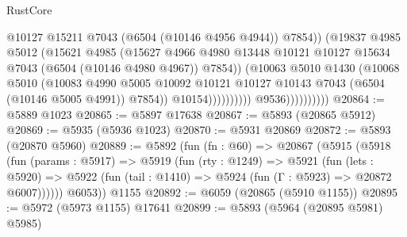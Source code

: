 \begin{lexlean}{RustCore}
\begin{coremodule}
                                            @10127
                                            @15211
                                            @7043
                                            (@6504 (@10146 @4956 @4944))
                                            @7854))
                                        (@19837
                                          @4985
                                          @5012
                                          (@15621
                                            @4985
                                            (@15627
                                              @4966
                                              @4980
                                              @13448
                                              @10121
                                              @10127
                                              @15634
                                              @7043
                                              (@6504 (@10146 @4980 @4967))
                                              @7854))
                                          (@10063
                                            @5010
                                            @1430
                                            (@10068
                                              @5010
                                              (@10083
                                                @4990
                                                @5005
                                                @10092
                                                @10121
                                                @10127
                                                @10143
                                                @7043
                                                (@6504 (@10146 @5005 @4991))
                                                @7854))
                                            @10154))))))))))
                        @9536))))))))))
@20864 := @5889 @1023
@20865 := @5897 @17638
@20867 := @5893 (@20865 @5912)
@20869 := @5935 (@5936 @1023)
@20870 := @5931 @20869
@20872 := @5893 (@20870 @5960)
@20889 := @5892
    (fun (fn : @60) =>
    @20867
      (@5915
        (@5918
          (fun (params : @5917) =>
          @5919
            (fun (rty : @1249) =>
            @5921
              (fun (lets : @5920) =>
              @5922 (fun (tail : @1410) => @5924 (fun (Γ : @5923) => @20872 @6007))))))
        @6053))
    @1155
@20892 := @6059 (@20865 (@5910 @1155))
@20895 := @5972 (@5973 @1155) @17641
@20899 := @5893 (@5964 (@20895 @5981) @5985)

\end{coremodule}
\end{lexlean}
